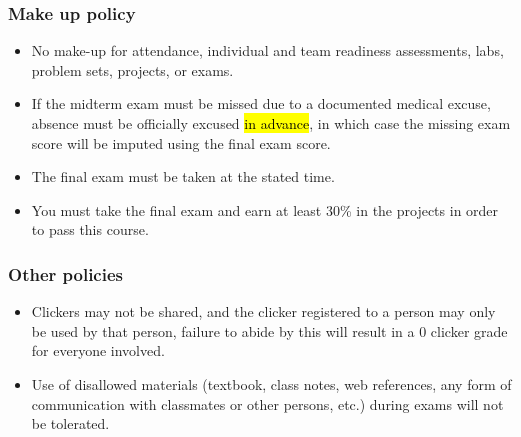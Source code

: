 \documentclass[slidestop,compress,mathserif,12pt,t,professionalfonts,xcolor=table]{beamer}
\begin{document}
\begin{frame}
\frametitle{Make up policy}

\begin{itemize}

\item No make-up for attendance, individual and team readiness assessments, labs, 
problem sets, projects, or exams.

\item If the midterm exam must be missed due to a documented medical excuse, absence 
must be officially excused \hl{in advance}, in which case the missing exam score will 
be imputed using the final exam score.

\item The final exam must be taken at the stated time.

\item You must take the final exam and earn at least 30\% in the projects in order to 
pass this course.

\end{itemize}


\end{frame}


\begin{frame}
\frametitle{Other policies}

\begin{itemize}

\item Clickers may not be shared, and the clicker registered to a person may only be 
used by that person, failure to abide by this will result in a 0 clicker grade for 
everyone involved.

\item Use of disallowed materials (textbook, class notes, web references, any form of 
communication with classmates or other persons, etc.) during exams will not be 
tolerated.

\end{itemize}


\end{frame}

\end{document}
